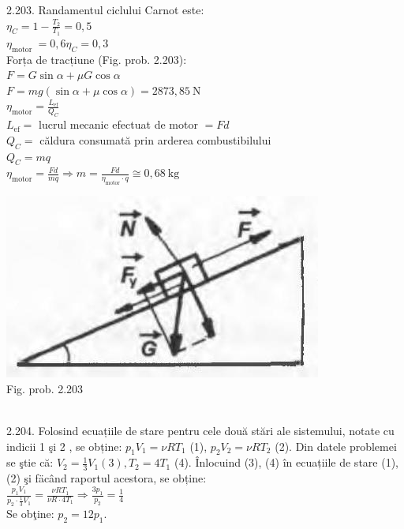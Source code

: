 2.203. Randamentul ciclului Carnot este:\\ $\eta_{C}=1-\frac{T_{2}}{T_{1}}=0,5$\\ $\eta_{\text {motor }}=0,6 \eta_{C}=0,3$\\ Forța de tracțiune (Fig. prob. 2.203):\\ $F=G \sin \alpha+\mu G \cos \alpha$\\ $F=m g(\sin \alpha+\mu \cos \alpha)=2873,85 \mathrm{~N}$\\ $\eta_{\text{motor}}=\frac{L_{\text{ef}}}{Q_{C}}$\\ $L_{\text{ef}}=$ lucrul mecanic efectuat de motor $=F d$\\ $Q_{C}=$ căldura consumată prin arderea combustibilului\\ $Q_{C}=m q$\\ $\eta_{\text{motor}}=\frac{F d}{m q} \Rightarrow m=\frac{F d}{\eta_{\text{motor}} \cdot q} \cong 0,68 \mathrm{~kg}$\\ \begin{center} \includegraphics[width=0.4\linewidth]{images/2025_07_01_5b3ff9fa0d508c8e9f17g-314}\\ Fig. prob. 2.203 \end{center}\\

2.204. Folosind ecuațiile de stare pentru cele două stări ale sistemului, notate cu indicii 1 şi 2 , se obține: $p_{1} V_{1}=\nu R T_{1}$ (1), $p_{2} V_{2}=\nu R T_{2}$ (2). Din datele problemei se ştie că: $V_{2}=\frac{1}{3} V_{1}(3), T_{2}=4 T_{1}$ (4). Înlocuind (3), (4) în ecuațiile de stare (1), (2) şi fäcând raportul acestora, se obține:\\ $\frac{p_{1} V_{1}}{p_{2} \cdot \frac{1}{3} V_{1}}=\frac{\nu R T_{1}}{\nu R \cdot 4 T_{1}} \Rightarrow \frac{3 p_{1}}{p_{2}}=\frac{1}{4} \tag{5}$\\ Se obţine: $p_{2}=12 p_{1}$.\\

